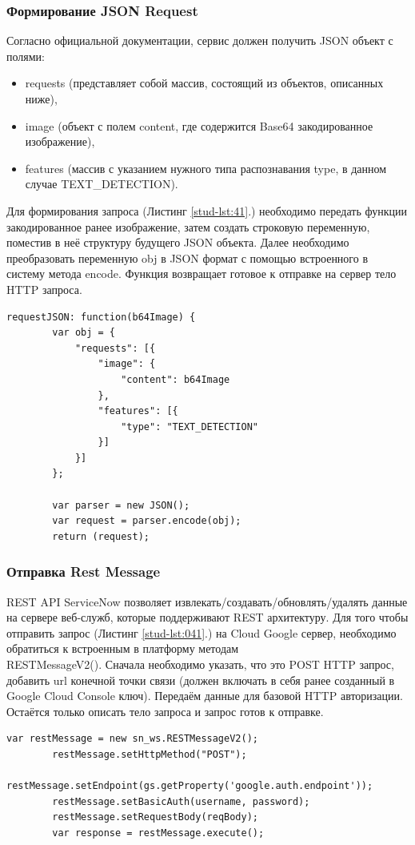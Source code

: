 \documentclass[14pt]{mmcs_article}
\begin{document}
\subsubsection{Формирование JSON Request}
Согласно официальной документации, сервис должен получить JSON объект с полями:
\begin{itemize}
\item requests (представляет собой массив, состоящий из объектов, описанных ниже),
\item image (объект с полем content, где содержится Base64 закодированное изображение),
\item features (массив с указанием нужного типа распознавания type, в данном случае TEXT\_DETECTION).
\end{itemize}

Для формирования запроса (Листинг \ref{stud-lst:41}.) необходимо передать функции закодированное ранее изображение, затем создать строковую переменную, поместив в неё структуру будущего JSON объекта. Далее необходимо преобразовать переменную obj в JSON формат с помощью встроенного в систему метода encode. Функция возвращает готовое к отправке на сервер тело HTTP запроса. 
\newpage
\begin{lstlisting}[caption=Функция создания JSON запроса, label=stud-lst:41]
 requestJSON: function(b64Image) {
        var obj = {
            "requests": [{
                "image": {
                    "content": b64Image
                },
                "features": [{
                    "type": "TEXT_DETECTION"
                }]
            }]
        };

        var parser = new JSON();
        var request = parser.encode(obj);
        return (request);
\end{lstlisting}
 

\subsubsection{Отправка Rest Message}
REST API ServiceNow позволяет извлекать/создавать/обновлять/удалять данные на сервере веб-служб, которые поддерживают REST архитектуру.
Для того чтобы отправить запрос (Листинг \ref{stud-lst:041}.) на Cloud Google сервер, необходимо обратиться к встроенным в платформу методам \\RESTMessageV2(). Сначала необходимо указать, что это POST HTTP запрос, добавить url конечной точки связи (должен включать в себя ранее созданный в Google Cloud Console ключ). Передаём данные для базовой HTTP авторизации. Остаётся только описать тело запроса и запрос готов к отправке.     
\begin{lstlisting}[caption=Rest Message, label=stud-lst:041]
        var restMessage = new sn_ws.RESTMessageV2();
        restMessage.setHttpMethod("POST");
        restMessage.setEndpoint(gs.getProperty('google.auth.endpoint'));
        restMessage.setBasicAuth(username, password);
        restMessage.setRequestBody(reqBody);
        var response = restMessage.execute();

\end{lstlisting}
\end{document}
